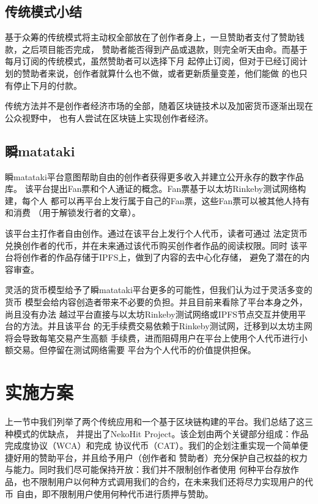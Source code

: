 \documentclass[11pt,UTF8,a4paper]{ctexart}
\begin{document}
    \subsection{传统模式小结}\label{subsec:tradition_summary}

    基于众筹的传统模式将主动权全部放在了创作者身上，一旦赞助者支付了赞助钱款，之后项目能否完成，
    赞助者能否得到产品或退款，则完全听天由命。而基于每月订阅的传统模式，虽然赞助者可以选择下月
    起停止订阅，但对于已经订阅计划的赞助者来说，创作者就算什么也不做，或者更新质量变差，他们能做
    的也只有停止下月的付款。

    传统方法并不是创作者经济市场的全部，随着区块链技术以及加密货币逐渐出现在公众视野中，
    也有人尝试在区块链上实现创作者经济。

    \subsection{瞬matataki}\label{subsec:blockchain_matataki}

    瞬matataki平台意图帮助自由的创作者获得更多收入并建立公开永存的数字作品库。
    该平台提出Fan票和个人通证的概念。Fan票基于以太坊Rinkeby测试网络构建，每个人
    都可以再平台上发行属于自己的Fan票，这些Fan票可以被其他人持有和消费
    （用于解锁发行者的文章）\cite{mitataki_fan_ticket}。

    该平台主打作者自由创作。通过在该平台上发行个人代币，读者可通过
    法定货币兑换创作者的代币，并在未来通过该代币购买创作者作品的阅读权限。同时
    该平台将创作者的作品存储于IPFS\cite{ipfs}上，做到了内容的去中心化存储，
    避免了潜在的内容审查。

    灵活的货币模型给予了瞬matataki平台更多的可能性，但我们认为过于灵活多变的货币
    模型会给内容创造者带来不必要的负担。并且目前来看除了平台本身之外，尚且没有办法
    越过平台直接与以太坊Rinkeby测试网络或IPFS节点交互并使用平台的方法。并且该平台
    的无手续费交易依赖于Rinkeby测试网，迁移到以太坊主网将会导致每笔交易产生高额
    手续费，进而阻碍用户在平台上使用个人代币进行小额交易。但停留在测试网络需要
    平台为个人代币的价值提供担保。


    \section{实施方案}\label{sec:solution}

    上一节中我们列举了两个传统应用和一个基于区块链构建的平台。我们总结了这三种模式的优缺点，
    并提出了NekoHit Project。该企划由两个关键部分组成：作品完成度协议（WCA）和完成
    协议代币（CAT）。我们的企划注重实现一个简单便捷好用的赞助平台，并且给予用户（创作者和
    赞助者）充分保护自己权益的权力与能力。同时我们尽可能保持开放：我们并不限制创作者使用
    何种平台存放作品，也不限制用户以何种方式调用我们的合约，在未来我们还将尽力实现用户的代币
    自由，即不限制用户使用何种代币进行质押与赞助。
\end{document}
